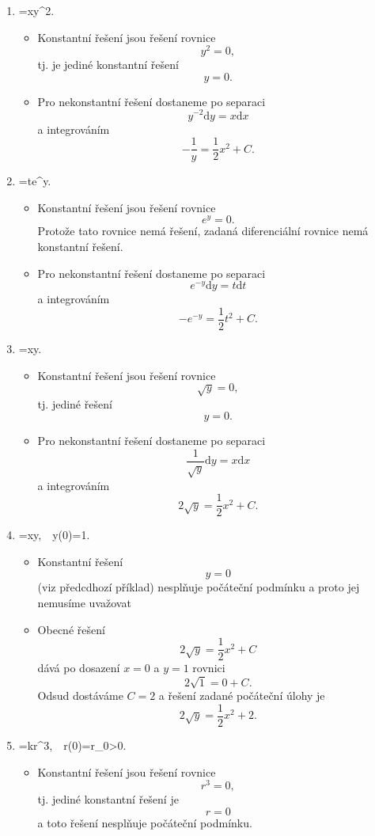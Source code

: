 \begin{enumerate}[(1)]
\item \priklad {}=x\cdot y^2.
  \begin{itemize}
  \item Konstantní řešení jsou řešení rovnice $$ y^2=0,$$ tj. je jediné konstantní řešení $$ y=0.$$
  \item Pro nekonstantní řešení dostaneme po separaci  $$ y^{-2}\mathrm dy=x\mathrm dx $$ a integrováním $$ -\frac 1y=\frac 12 x^2+C.$$
  \end{itemize}
\item \priklad {}=t\cdot e^y.
  \begin{itemize}
  \item Konstantní řešení jsou řešení rovnice $$ e^y=0.$$ Protože tato rovnice nemá řešení, zadaná diferenciální rovnice nemá konstantní řešení.
  \item Pro nekonstantní řešení dostaneme po separaci  $$ e^{-y}\mathrm dy= t\mathrm dt$$ a integrováním $$ -e^{-y}=\frac 12 t^2 +C.$$
  \end{itemize}
\item \priklad {}=x\cdot \sqrt y.
  \begin{itemize}
  \item Konstantní řešení jsou řešení rovnice $$ \sqrt y=0,$$ tj. jediné řešení $$ y=0.$$
  \item Pro nekonstantní řešení dostaneme po separaci  $$ \frac 1{\sqrt y}\mathrm dy=x\mathrm dx $$ a integrováním $$ 2\sqrt y=\frac 12 x^2+C.$$
  \end{itemize}
\item \priklad {}=x\sqrt y,\ \ y(0)=1.
  \begin{itemize}
  \item Konstantní řešení $$y=0$$ (viz předcdhozí příklad) nesplňuje počáteční podmínku a proto jej nemusíme uvažovat
  \item Obecné řešení  $$ 2\sqrt y=\frac 12x^2 +C$$ dává po dosazení $x=0$ a $y=1$ rovnici $$2\sqrt 1=0+C.$$ Odsud dostáváme $C=2$ a řešení zadané počáteční úlohy je $$2\sqrt y=\frac 12 x^2+2.$$
  \end{itemize}
\item \priklad {}=k\cdot r^3,\ \ r(0)=r_0>0.
  \begin{itemize}
  \item Konstantní řešení jsou řešení rovnice $$ r^3=0,$$ tj. jediné konstantní řešení je $$ r=0$$ a toto řešení nesplňuje počáteční podmínku.

\end{itemize}
\end{enumerate}
